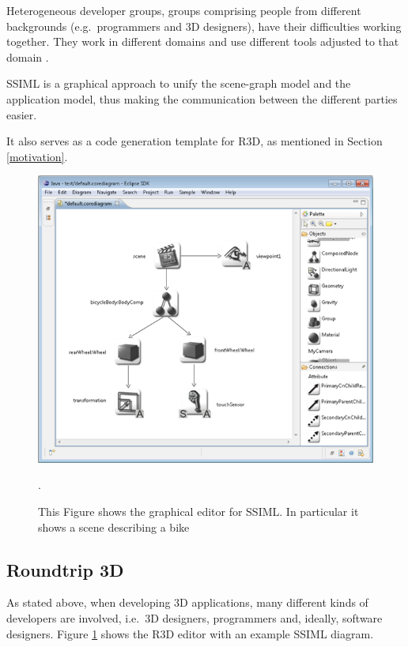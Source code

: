 Heterogeneous developer groups, groups comprising people from
different backgrounds (e.g.~programmers and \gls{3D} designers), have their difficulties
working together. They work in different domains and use different tools
adjusted to that domain \cite{Glinz:2015:SUS:2802768.2802838}.

SSIML is a graphical approach to unify the scene-graph model and the
application model, thus making the communication between the different
parties easier.

It also serves as a code generation template for \gls{R3D}, as mentioned in Section \ref{motivation}.

\begin{figure}
  \centering
  \includegraphics[width=12cm]{../assets/SSIML.png}
	\caption{This Figure shows the graphical editor for SSIML. In particular it shows a scene describing a bike \cite{roundtrip3dwebsite}}.
	\label{fig:ssimldiagram}
\end{figure}

\subsection{Roundtrip 3D}\label{roundtrip-3d}

As stated above, when developing \gls{3D} applications, many different kinds of
developers are involved, i.e.~\gls{3D} designers, programmers and, ideally,
software designers. Figure \ref{fig:ssimldiagram} shows the \gls{R3D} editor with an example \gls{SSIML} diagram.


